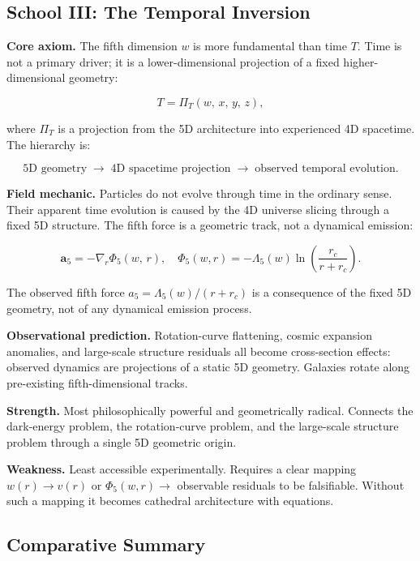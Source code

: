 \documentclass[11pt,a4paper]{article}
\newcommand{\Lf}{\Lambda_5}                  %
\newcommand{\afive}{\mathbf{a}_5}            %
\newcommand{\afiver}{a_5}                    %
\newcommand{\Phifive}{\Phi_5}                %
\begin{document}
\subsection{School III: The Temporal Inversion}\label{sec:school3}

\textbf{Core axiom.} The fifth dimension $w$ is more fundamental than time $T$.
Time is not a primary driver; it is a lower-dimensional projection of a fixed
higher-dimensional geometry:

\[
  T = \Pi_T(w,\,x,\,y,\,z) ,
\]

where $\Pi_T$ is a projection from the 5D architecture into experienced 4D
spacetime.  The hierarchy is:

\[
  \text{5D geometry} \;\longrightarrow\; \text{4D spacetime projection}
  \;\longrightarrow\; \text{observed temporal evolution.}
\]

\textbf{Field mechanic.} Particles do not evolve through time in the ordinary
sense.  Their apparent time evolution is caused by the 4D universe slicing
through a fixed 5D structure.  The fifth force is a geometric track, not a
dynamical emission:

\[
  \afive = -\nabla_r \Phifive(w,\,r) ,
  \quad
  \Phifive(w,r) = -\Lf(w)\ln\!\left(\frac{r_c}{r+r_c}\right) .
\]

The observed fifth force $\afiver = \Lf(w)/(r+r_c)$ is a consequence of the
fixed 5D geometry, not of any dynamical emission process.

\textbf{Observational prediction.} Rotation-curve flattening, cosmic
expansion anomalies, and large-scale structure residuals all become
cross-section effects: observed dynamics are projections of a static 5D
geometry.  Galaxies rotate along pre-existing fifth-dimensional tracks.

\textbf{Strength.} Most philosophically powerful and geometrically radical.
Connects the dark-energy problem, the rotation-curve problem, and the
large-scale structure problem through a single 5D geometric origin.

\textbf{Weakness.} Least accessible experimentally.  Requires a clear mapping
$w(r) \to v(r)$ or $\Phifive(w,r) \to$ observable residuals to be falsifiable.
Without such a mapping it becomes cathedral architecture with equations.

\subsection{Comparative Summary}\label{sec:synthesis}
\end{document}
